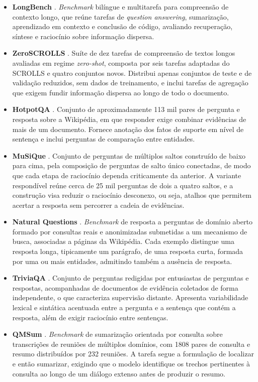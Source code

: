 \begin{itemize}[leftmargin=1.6em]
\item \textbf{LongBench} \cite{bai2023longbench}. \textit{Benchmark} bilíngue e multitarefa para compreensão de contexto longo, que reúne tarefas de \textit{question answering}, sumarização, aprendizado em contexto e conclusão de código, avaliando recuperação, síntese e raciocínio sobre informação dispersa.

\item \textbf{ZeroSCROLLS} \cite{shaham2023zeroscrolls}. Suíte de dez tarefas de compreensão de textos longos avaliadas em regime \textit{zero-shot}, composta por seis tarefas adaptadas do SCROLLS e quatro conjuntos novos. Distribui apenas conjuntos de teste e de validação reduzidos, sem dados de treinamento, e inclui tarefas de agregação que exigem fundir informação dispersa ao longo de todo o documento.

\item \textbf{HotpotQA} \cite{yang2018hotpotqa}. Conjunto de aproximadamente 113 mil pares de pergunta e resposta sobre a Wikipédia, em que responder exige combinar evidências de mais de um documento. Fornece anotação dos fatos de suporte em nível de sentença e inclui perguntas de comparação entre entidades.

\item \textbf{MuSiQue} \cite{trivedi2022musique}. Conjunto de perguntas de múltiplos saltos construído de baixo para cima, pela composição de perguntas de salto único conectadas, de modo que cada etapa de raciocínio dependa criticamente da anterior. A variante respondível reúne cerca de 25 mil perguntas de dois a quatro saltos, e a construção visa reduzir o raciocínio desconexo, ou seja, atalhos que permitem acertar a resposta sem percorrer a cadeia de evidências.

\item \textbf{Natural Questions} \cite{kwiatkowski2019natural}. \textit{Benchmark} de resposta a perguntas de domínio aberto formado por consultas reais e anonimizadas submetidas a um mecanismo de busca, associadas a páginas da Wikipédia. Cada exemplo distingue uma resposta longa, tipicamente um parágrafo, de uma resposta curta, formada por uma ou mais entidades, admitindo também a ausência de resposta.

\item \textbf{TriviaQA} \cite{joshi2017triviaqa}. Conjunto de perguntas redigidas por entusiastas de perguntas e respostas, acompanhadas de documentos de evidência coletados de forma independente, o que caracteriza supervisão distante. Apresenta variabilidade lexical e sintática acentuada entre a pergunta e a sentença que contém a resposta, além de exigir raciocínio entre sentenças.

\item \textbf{QMSum} \cite{zhong2021qmsum}. \textit{Benchmark} de sumarização orientada por consulta sobre transcrições de reuniões de múltiplos domínios, com 1808 pares de consulta e resumo distribuídos por 232 reuniões. A tarefa segue a formulação de localizar e então sumarizar, exigindo que o modelo identifique os trechos pertinentes à consulta ao longo de um diálogo extenso antes de produzir o resumo.
\end{itemize}


